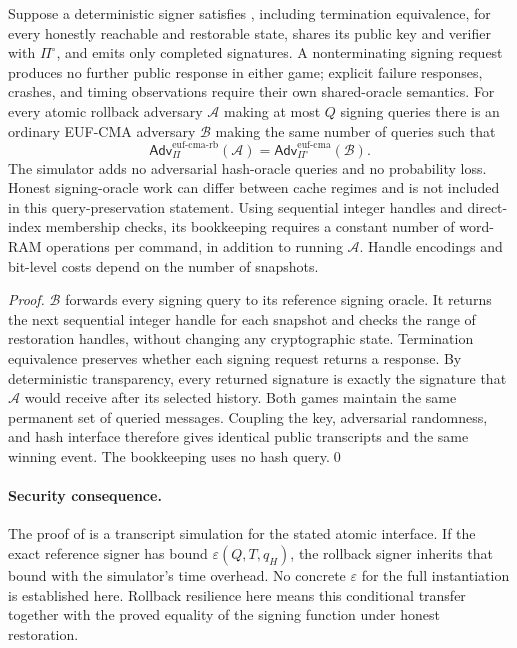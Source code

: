 \documentclass[a4paper,envcountsame,runningheads]{llncs}
\newcommand{\Adv}{\mathsf{Adv}}
\newcommand{\eps}{\varepsilon}
\begin{document}
\begin{theorem}\label{thm:transfer}
Suppose a deterministic signer satisfies , including termination equivalence, for every honestly reachable and restorable state, shares its public key and verifier with $\Pi^\circ$, and emits only completed signatures. A nonterminating signing request produces no further public response in either game; explicit failure responses, crashes, and timing observations require their own shared-oracle semantics. For every atomic rollback adversary $\mathcal A$ making at most $Q$ signing queries there is an ordinary EUF-CMA adversary $\mathcal B$ making the same number of queries such that
\[
 \Adv^{\mathrm{euf\text{-}cma\text{-}rb}}_\Pi(\mathcal A)
 =\Adv^{\mathrm{euf\text{-}cma}}_{\Pi^\circ}(\mathcal B).
\]
The simulator adds no adversarial hash-oracle queries and no probability loss. Honest signing-oracle work can differ between cache regimes and is not included in this query-preservation statement. Using sequential integer handles and direct-index membership checks, its bookkeeping requires a constant number of word-RAM operations per command, in addition to running $\mathcal A$. Handle encodings and bit-level costs depend on the number of snapshots.
\end{theorem}
\begin{proof}
$\mathcal B$ forwards every signing query to its reference signing oracle. It returns the next sequential integer handle for each snapshot and checks the range of restoration handles, without changing any cryptographic state. Termination equivalence preserves whether each signing request returns a response. By deterministic transparency, every returned signature is exactly the signature that $\mathcal A$ would receive after its selected history. Both games maintain the same permanent set of queried messages. Coupling the key, adversarial randomness, and hash interface therefore gives identical public transcripts and the same winning event. The bookkeeping uses no hash query.\qed
\end{proof}

\paragraph{Security consequence.}
The proof of  is a transcript simulation for the stated atomic interface. If the exact reference signer has bound $\eps(Q,T,q_H)$, the rollback signer inherits that bound with the simulator's time overhead. No concrete $\eps$ for the full instantiation is established here. Rollback resilience here means this conditional transfer together with the proved equality of the signing function under honest restoration.
\end{document}
